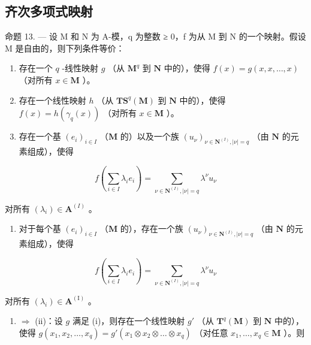 \subsection{齐次多项式映射}

命题 13. --- 设 M 和 N 为 A-模，q 为整数 ≥ 0，f 为从 M 到 N 的一个映射。假设 M 是自由的，则下列条件等价：

\begin{enumerate}
\def\labelenumi{(\roman{enumi})}
\item
  存在一个 \(q\) -线性映射 \(g\) （从 \(\mathbf{M}^q\) 到 \(\mathbf{N}\) 中的），使得 \(f(x) = g(x, x, \ldots, x)\) （对所有 \(x \in \mathbf{M}\) ）。
\item
  存在一个线性映射 \(h\) （从 \(\mathbf{T}\mathbf{S}^q (\mathbf{M})\) 到 \(\mathbf{N}\) 中的），使得 \(f(x) = h(\gamma_q(x))\) （对所有 \(x \in \mathbf{M}\) ）。
\item
  存在一个基 \((e_i)_{i\in I}\) （\(\mathbf{M}\) 的）以及一个族 \((u_{\nu})_{\nu \in \mathbf{N}^{(I)},|\nu| = q}\) （由 \(\mathbf{N}\) 的元素组成），使得
\end{enumerate}

\[
f \left(\sum_ {i \in I} \lambda_ {i} e _ {i}\right) = \sum_ {\nu \in \mathbf {N} ^ {(I)}, | \nu | = q} \lambda^ {\nu} u _ {\nu}\tag{15}
\]

对所有 \((\lambda_i) \in \mathbf{A}^{(I)}\) 。

\begin{enumerate}
\def\labelenumi{(\roman{enumi})}
\setcounter{enumi}{3}
\tightlist
\item
  对于每个基 \((e_i)_{i\in I}\) （\(\mathbf{M}\) 的），存在一个族 \((u_{\nu})_{\nu\in \mathbf{N}^{(I)},|\nu| = q}\) （由 \(\mathbf{N}\) 的元素组成），使得
\end{enumerate}

\[
f \left(\sum_ {i \in I} \lambda_ {i} e _ {i}\right) = \sum_ {\nu \in \mathbf {N} ^ {(I)}, | \nu | = q} \lambda^ {\nu} u _ {\nu}
\]

对所有 \((\lambda_i) \in \mathbf{A}^{(\mathrm{I})}\) 。

\begin{enumerate}
\def\labelenumi{(\roman{enumi})}
\tightlist
\item
  \(\Rightarrow\) (ii)：设 \(g\) 满足 (i)，则存在一个线性映射 \(g'\) （从 \(\mathbf{T}^q (\mathbf{M})\) 到 \(\mathbf{N}\) 中的），使得 \(g(x_{1},x_{2},\ldots ,x_{q}) = g'(x_{1}\otimes x_{2}\otimes \ldots \otimes x_{q})\) （对任意 \(x_{1},\ldots ,x_{q}\in \mathbf{M}\) ）。则
\end{enumerate}

